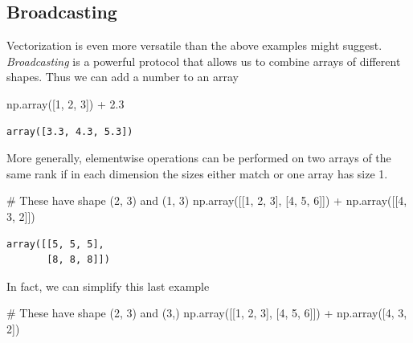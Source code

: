 \documentclass[
  letterpaper,
  DIV=11,
  numbers=noendperiod]{scrreprt}
\newenvironment{Shaded}{\begin{snugshade}}{\end{snugshade}}
\newcommand{\CommentTok}[1]{\textcolor[rgb]{0.37,0.37,0.37}{#1}}
\newcommand{\DecValTok}[1]{\textcolor[rgb]{0.68,0.00,0.00}{#1}}
\newcommand{\FloatTok}[1]{\textcolor[rgb]{0.68,0.00,0.00}{#1}}
\newcommand{\NormalTok}[1]{\textcolor[rgb]{0.00,0.23,0.31}{#1}}
\newcommand{\OperatorTok}[1]{\textcolor[rgb]{0.37,0.37,0.37}{#1}}
\theoremstyle{definition}
\theoremstyle{remark}
\begin{document}
\hypertarget{broadcasting}{%
\subsection{Broadcasting}\label{broadcasting}}

Vectorization is even more versatile than the above examples might
suggest. \emph{Broadcasting} is a powerful protocol that allows us to
combine arrays of different shapes. Thus we can add a number to an array

\begin{Shaded}
\begin{Highlighting}[]
\NormalTok{np.array([}\DecValTok{1}\NormalTok{, }\DecValTok{2}\NormalTok{, }\DecValTok{3}\NormalTok{]) }\OperatorTok{+} \FloatTok{2.3}
\end{Highlighting}
\end{Shaded}

\begin{verbatim}
array([3.3, 4.3, 5.3])
\end{verbatim}

More generally, elementwise operations can be performed on two arrays of
the same rank if in each dimension the sizes either match or one array
has size 1.

\begin{Shaded}
\begin{Highlighting}[]
\CommentTok{\# These have shape (2, 3) and (1, 3)}
\NormalTok{np.array([[}\DecValTok{1}\NormalTok{, }\DecValTok{2}\NormalTok{, }\DecValTok{3}\NormalTok{], [}\DecValTok{4}\NormalTok{, }\DecValTok{5}\NormalTok{, }\DecValTok{6}\NormalTok{]]) }\OperatorTok{+}\NormalTok{ np.array([[}\DecValTok{4}\NormalTok{, }\DecValTok{3}\NormalTok{, }\DecValTok{2}\NormalTok{]])}
\end{Highlighting}
\end{Shaded}

\begin{verbatim}
array([[5, 5, 5],
       [8, 8, 8]])
\end{verbatim}

In fact, we can simplify this last example

\begin{Shaded}
\begin{Highlighting}[]
\CommentTok{\# These have shape (2, 3) and (3,)}
\NormalTok{np.array([[}\DecValTok{1}\NormalTok{, }\DecValTok{2}\NormalTok{, }\DecValTok{3}\NormalTok{], [}\DecValTok{4}\NormalTok{, }\DecValTok{5}\NormalTok{, }\DecValTok{6}\NormalTok{]]) }\OperatorTok{+}\NormalTok{ np.array([}\DecValTok{4}\NormalTok{, }\DecValTok{3}\NormalTok{, }\DecValTok{2}\NormalTok{])}
\end{Highlighting}
\end{Shaded}
\end{document}
